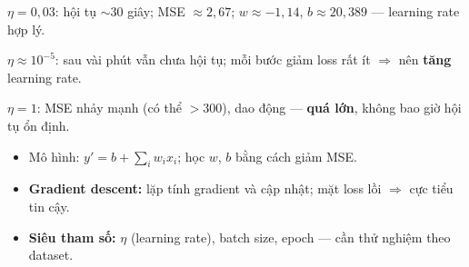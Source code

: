 \documentclass[12pt,a4paper]{article}
\begin{document}
\begin{vidu}[title={Đáp án nhiệm vụ 1}]
$\eta = 0{,}03$: hội tụ $\sim$30 giây; MSE $\approx 2{,}67$; $w \approx -1{,}14$, $b \approx 20{,}389$ --- learning rate hợp lý.
\end{vidu}

\begin{vidu}[title={Đáp án nhiệm vụ 2}]
$\eta \approx 10^{-5}$: sau vài phút vẫn chưa hội tụ; mỗi bước giảm loss rất ít $\Rightarrow$ nên \textbf{tăng} learning rate.
\end{vidu}

\begin{vidu}[title={Đáp án nhiệm vụ 3}]
$\eta = 1$: MSE nhảy mạnh (có thể $> 300$), dao động --- \textbf{quá lớn}, không bao giờ hội tụ ổn định.
\end{vidu}

\begin{tongket}[title={Tổng kết chương --- Hồi quy tuyến tính}]
\begin{itemize}
  \item Mô hình: $y' = b + \displaystyle\sum_i w_i x_i$; học $w$, $b$ bằng cách giảm MSE.
  \item \textbf{Gradient descent:} lặp tính gradient và cập nhật; mặt loss lồi $\Rightarrow$ cực tiểu tin cậy.
  \item \textbf{Siêu tham số:} $\eta$ (learning rate), batch size, epoch --- cần thử nghiệm theo dataset.
\end{itemize}
\end{tongket}
\end{document}
